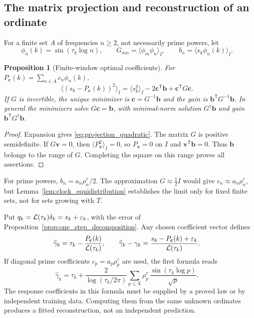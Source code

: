 \documentclass[11pt,reqno]{amsart}
\theoremstyle{plain}\newtheorem{theorem}{Theorem}[section]\newtheorem{proposition}[theorem]{Proposition}\newtheorem{lemma}[theorem]{Lemma}\newtheorem{corollary}[theorem]{Corollary}
\theoremstyle{definition}\newtheorem{hypothesis}[theorem]{Hypothesis}\newtheorem{definition}[theorem]{Definition}
\theoremstyle{remark}\newtheorem{remark}[theorem]{Remark}\newtheorem{experiment}[theorem]{Experiment}\newtheorem{question}[theorem]{Question}\newtheorem{heuristic}[theorem]{Heuristic}\newtheorem{conjecture}[theorem]{Conjecture}
\begin{document}
\subsection{The matrix projection and reconstruction of an ordinate}
\label{subsec:matrix_projection}
For a finite set $A$ of frequencies $n\ge2$, not necessarily prime powers, let
\begin{equation}
 \phi_n(k)=\sin(\tau_k\log n),\qquad
 G_{mn}=\langle\phi_m\phi_n\rangle_I,\qquad
 b_n=\langle s_k\phi_n(k)\rangle_I.
 \label{eq:Gram_projection}
\end{equation}
\begin{proposition}[Finite-window optimal coefficients]\label{prop:matrix_projection}
For $P_{\mathbf c}(k)=\sum_{n\in A}c_n\phi_n(k)$,
\begin{equation}
 \langle(s_k-P_{\mathbf c}(k))^2\rangle_I
 =\langle s_k^2\rangle_I-2\mathbf c^{\mathsf T}\mathbf b
       +\mathbf c^{\mathsf T}G\mathbf c.
 \label{eq:projection_quadratic}
\end{equation}
If $G$ is invertible, the unique minimizer is $\mathbf c=G^{-1}\mathbf b$ and the gain is $\mathbf b^{\mathsf T}G^{-1}\mathbf b$. In general the minimizers solve $G\mathbf c=\mathbf b$, with minimal-norm solution $G^\dagger\mathbf b$ and gain $\mathbf b^{\mathsf T}G^\dagger\mathbf b$.
\end{proposition}
\begin{proof}
Expansion gives \eqref{eq:projection_quadratic}. The matrix $G$ is positive semidefinite. If $G\mathbf v=0$, then $\langle P_{\mathbf v}^2\rangle_I=0$, so $P_{\mathbf v}=0$ on $I$ and $\mathbf v^{\mathsf T}\mathbf b=0$. Thus $\mathbf b$ belongs to the range of $G$. Completing the square on this range proves all assertions.
\end{proof}
For prime powers, $b_n=a_n\rho_n^\tau/2$. The approximation $G\approx\frac12I$ would give $c_n\approx a_n\rho_n^\tau$, but Lemma~\ref{lem:clock_equidistribution} establishes the limit only for fixed finite sets, not for sets growing with $T$.

Put $q_k=\mathcal L(\tau_k)\delta_k=s_k+\varepsilon_k$, with the error of Proposition~\ref{prop:one_step_decomposition}. Any chosen coefficient vector defines
\begin{equation}
 \widehat\gamma_k=\tau_k-\frac{P_{\mathbf c}(k)}{\mathcal L(\tau_k)},\qquad
 \widehat\gamma_k-\gamma_k
   =\frac{s_k-P_{\mathbf c}(k)+\varepsilon_k}{\mathcal L(\tau_k)}.
 \label{eq:matrix_reconstruction}
\end{equation}
If diagonal prime coefficients $c_p=a_p\rho_p^\tau$ are used, the first formula reads
\begin{equation}
 \widehat\gamma_k=\tau_k+
 \frac{2}{\log(\tau_k/2\pi)}\sum_{p\le X}
 \rho_p^\tau\,\frac{\sin(\tau_k\log p)}{\sqrt p}.
 \label{eq:rho_tau_predictor}
\end{equation}
The response coefficients in this formula must be supplied by a proved law or by independent training data. Computing them from the same unknown ordinates produces a fitted reconstruction, not an independent prediction.
\end{document}
